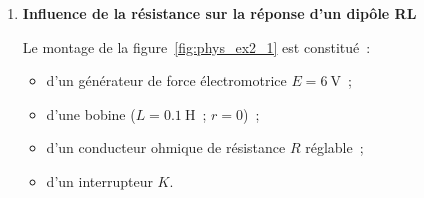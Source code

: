 \begin{enumerate}
    \item \textbf{Influence de la résistance sur la réponse d'un dipôle RL}

          \begin{minipage}{0.59\linewidth}
              Le montage de la figure~\ref{fig:phys_ex2_1} est constitué~:
              \begin{itemize}
                  \item d'un générateur de force électromotrice
                        $E=\qty{6}{\volt}$~;
                  \item d'une bobine ($L=\qty{0,1}{\henry}$~; $r=0$)~;
                  \item d'un conducteur ohmique de résistance $R$ réglable~;
                  \item d'un interrupteur $K$.
              \end{itemize}
              

\end{minipage}
\end{enumerate}
